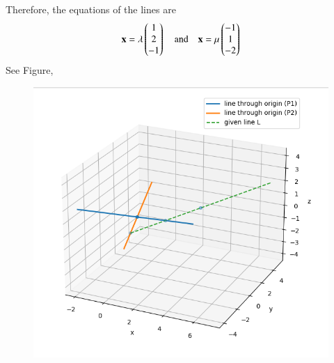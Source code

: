 \documentclass[journal]{IEEEtran}
\begin{document}
Therefore, the equations of the lines are
\begin{align}
    \mathbf{x} = \lambda\begin{pmatrix}1\\2\\-1\end{pmatrix} \quad \text{and} \quad \mathbf{x} = \mu\begin{pmatrix}-1\\1\\-2\end{pmatrix}
\end{align}
See Figure,
\begin{figure}[h!]
    \centering
    \includegraphics[height=0.5\textheight, keepaspectratio]{figs/fig.png}
\end{figure}
\end{document}
